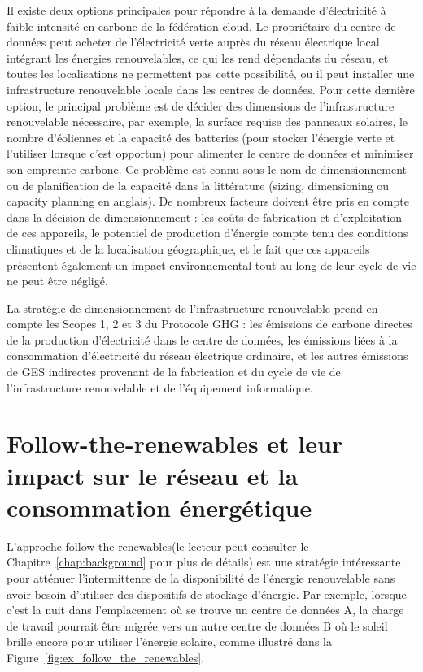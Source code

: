 Il existe deux options principales pour répondre à la demande d'électricité à faible intensité en carbone de la fédération cloud. Le propriétaire du centre de données peut acheter de l'électricité verte auprès du réseau électrique local intégrant les énergies renouvelables, ce qui les rend dépendants du réseau, et toutes les localisations ne permettent pas cette possibilité, ou il peut installer une infrastructure renouvelable locale dans les centres de données. Pour cette dernière option, le principal problème est de décider des dimensions de l'infrastructure renouvelable nécessaire, par exemple, la surface requise des panneaux solaires, le nombre d'éoliennes et la capacité des batteries (pour stocker l'énergie verte et l'utiliser lorsque c'est opportun) pour alimenter le centre de données et minimiser son empreinte carbone. Ce problème est connu sous le nom de dimensionnement ou de planification de la capacité dans la littérature (sizing, dimensioning ou capacity planning en anglais). De nombreux facteurs doivent être pris en compte dans la décision de dimensionnement : les coûts de fabrication et d'exploitation de ces appareils, le potentiel de production d'énergie compte tenu des conditions climatiques et de la localisation géographique, et le fait que ces appareils présentent également un impact environnemental tout au long de leur cycle de vie ne peut être négligé.

La stratégie de dimensionnement de l'infrastructure renouvelable prend en compte les Scopes 1, 2 et 3 du Protocole GHG : les émissions de carbone directes de la production d'électricité dans le centre de données, les émissions liées à la consommation d'électricité du réseau électrique ordinaire, et les autres émissions de GES indirectes provenant de la fabrication et du cycle de vie de l'infrastructure renouvelable et de l'équipement informatique.

\section{Follow-the-renewables et leur impact sur le réseau et la consommation énergétique}


L'approche \guillemotleft follow-the-renewables\guillemotright (le lecteur peut consulter le Chapitre~\ref{chap:background} pour plus de détails) est une stratégie intéressante pour atténuer l'intermittence de la disponibilité de l'énergie renouvelable sans avoir besoin d'utiliser des dispositifs de stockage d'énergie. Par exemple, lorsque c'est la nuit dans l'emplacement où se trouve un centre de données A, la charge de travail pourrait être migrée vers un autre centre de données B où le soleil brille encore pour utiliser l'énergie solaire, comme illustré dans la Figure~\ref{fig:ex_follow_the_renewables}.

